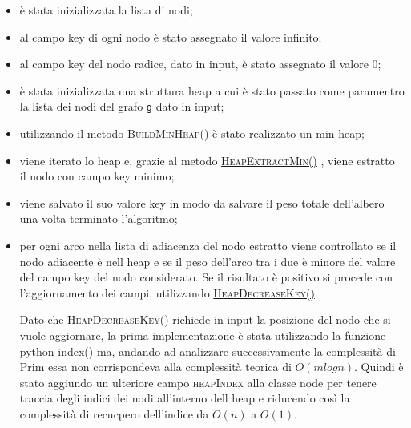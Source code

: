 \begin{itemize}
    \item è stata inizializzata la lista di nodi;
    \item al campo key di ogni nodo è stato assegnato il valore infinito;
    \item al campo key del nodo radice, dato in input, è stato assegnato il valore 0;
    \item è stata inizializzata una struttura heap a cui è stato passato come paramentro la lista dei nodi del grafo \texttt{g} dato in input;
    \item utilizzando il metodo \hyperlink{buildminheap}{\textsc{BuildMinHeap()}} è stato realizzato un min-heap;
    \item viene iterato lo heap e, grazie al metodo \hyperlink{heapextractmin}{\textsc{HeapExtractMin()}} , viene estratto il nodo con campo key minimo;
    \item viene salvato il suo valore key in modo da salvare il peso totale dell'albero una volta terminato l'algoritmo;
    \item per ogni arco nella lista di adiacenza del nodo estratto  viene controllato se il nodo adiacente è nell heap e se il peso dell'arco tra i due è minore del valore del campo key del nodo considerato. Se il risultato è positivo si procede con l'aggiornamento dei campi, utilizzando \hyperlink{heapdecreasekey}{\textsc{HeapDecreaseKey()}}.

Dato che \textsc{HeapDecreaseKey()} richiede in input la posizione del nodo che si vuole aggiornare, la prima implementazione è stata utilizzando la funzione python index() ma, andando ad analizzare successivamente la complessità di Prim essa non corrispondeva alla complessità teorica di $O(m log{} n)$. Quindi è stato aggiundo un ulteriore campo \textsc{heapIndex} alla classe node per tenere traccia degli indici dei nodi all'interno dell heap e riducendo così la complessità di recucpero dell'indice da $O(n)$ a $O(1)$.

\end{itemize}
